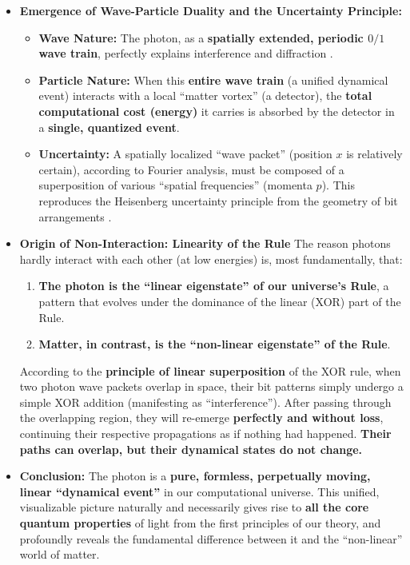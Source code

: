 \documentclass[11pt, a4paper]{article}
\begin{document}
\begin{itemize}
    \item \textbf{Emergence of Wave-Particle Duality and the Uncertainty Principle:}
    \begin{itemize}
        \item \textbf{Wave Nature:} The photon, as a \textbf{spatially extended, periodic $0/1$ wave train}, perfectly explains interference and diffraction \cite{deBroglie1930}.
        \item \textbf{Particle Nature:} When this \textbf{entire wave train} (a unified dynamical event) interacts with a local ``matter vortex'' (a detector), the \textbf{total computational cost (energy)} it carries is absorbed by the detector in a \textbf{single, quantized event}.
        \item \textbf{Uncertainty:} A spatially localized ``wave packet'' (position $x$ is relatively certain), according to Fourier analysis, must be composed of a superposition of various ``spatial frequencies'' (momenta $p$). This reproduces the Heisenberg uncertainty principle from the geometry of bit arrangements \cite{deBroglie1930}.
    \end{itemize}

    \item \textbf{Origin of Non-Interaction: Linearity of the Rule}
    The reason photons hardly interact with each other (at low energies) is, most fundamentally, that:
    \begin{enumerate}
        \item \textbf{The photon is the ``linear eigenstate'' of our universe's Rule}, a pattern that evolves under the dominance of the linear (XOR) part of the Rule.
        \item \textbf{Matter, in contrast, is the ``non-linear eigenstate'' of the Rule}.
    \end{enumerate}
    According to the \textbf{principle of linear superposition} of the XOR rule, when two photon wave packets overlap in space, their bit patterns simply undergo a simple XOR addition (manifesting as ``interference''). After passing through the overlapping region, they will re-emerge \textbf{perfectly and without loss}, continuing their respective propagations as if nothing had happened. \textbf{Their paths can overlap, but their dynamical states do not change.}

    \item \textbf{Conclusion:}
    The photon is a \textbf{pure, formless, perpetually moving, linear ``dynamical event''} in our computational universe. This unified, visualizable picture naturally and necessarily gives rise to \textbf{all the core quantum properties} of light from the first principles of our theory, and profoundly reveals the fundamental difference between it and the ``non-linear'' world of matter.
\end{itemize}
\end{document}
